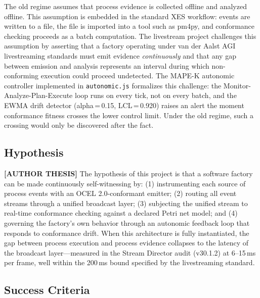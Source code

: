 The old regime assumes that process evidence is collected offline and analyzed
offline. This assumption is embedded in the standard XES workflow: events are
written to a file, the file is imported into a tool such as pm4py, and conformance
checking proceeds as a batch computation. The livestream project challenges this
assumption by asserting that a factory operating under van der Aalst AGI
livestreaming standards must emit evidence \emph{continuously} and that any
gap between emission and analysis represents an interval during which non-conforming
execution could proceed undetected. The MAPE-K autonomic controller implemented in
\texttt{autonomic.js} formalizes this challenge: the Monitor-Analyze-Plan-Execute
loop runs on every tick, not on every batch, and the EWMA drift detector (alpha\,=\,0.15,
LCL\,=\,0.920) raises an alert the moment conformance fitness crosses the lower
control limit. Under the old regime, such a crossing would only be discovered after
the fact.

\subsection{Hypothesis}
\label{sec:livestream-rq-hypothesis}

\textbf{[AUTHOR THESIS]} The hypothesis of this project is that a software factory
can be made continuously self-witnessing by: (1) instrumenting each source of
process events with an OCEL 2.0-conformant emitter; (2) routing all event streams
through a unified broadcast layer; (3) subjecting the unified stream to real-time
conformance checking against a declared Petri net model; and (4) governing the
factory's own behavior through an autonomic feedback loop that responds to
conformance drift. When this architecture is fully instantiated, the gap between
process execution and process evidence collapses to the latency of the broadcast
layer---measured in the Stream Director audit (v30.1.2) at 6--15\,ms per frame,
well within the 200\,ms bound specified by the livestreaming standard.

\subsection{Success Criteria}
\label{sec:livestream-rq-success}

